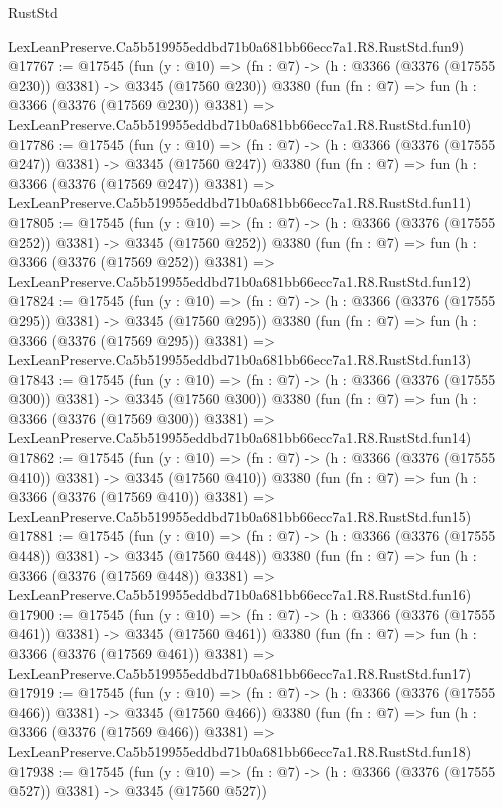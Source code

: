 \begin{lexlean}{RustStd}
\begin{coremodule}
    LexLeanPreserve.Ca5b519955eddbd71b0a681bb66ecc7a1.R8.RustStd.fun9)
@17767 := @17545
    (fun (y : @10) => (fn : @7) -> (h : @3366 (@3376 (@17555 @230)) @3381) -> @3345 (@17560 @230))
    @3380
    (fun (fn : @7) =>
    fun (h : @3366 (@3376 (@17569 @230)) @3381) =>
    LexLeanPreserve.Ca5b519955eddbd71b0a681bb66ecc7a1.R8.RustStd.fun10)
@17786 := @17545
    (fun (y : @10) => (fn : @7) -> (h : @3366 (@3376 (@17555 @247)) @3381) -> @3345 (@17560 @247))
    @3380
    (fun (fn : @7) =>
    fun (h : @3366 (@3376 (@17569 @247)) @3381) =>
    LexLeanPreserve.Ca5b519955eddbd71b0a681bb66ecc7a1.R8.RustStd.fun11)
@17805 := @17545
    (fun (y : @10) => (fn : @7) -> (h : @3366 (@3376 (@17555 @252)) @3381) -> @3345 (@17560 @252))
    @3380
    (fun (fn : @7) =>
    fun (h : @3366 (@3376 (@17569 @252)) @3381) =>
    LexLeanPreserve.Ca5b519955eddbd71b0a681bb66ecc7a1.R8.RustStd.fun12)
@17824 := @17545
    (fun (y : @10) => (fn : @7) -> (h : @3366 (@3376 (@17555 @295)) @3381) -> @3345 (@17560 @295))
    @3380
    (fun (fn : @7) =>
    fun (h : @3366 (@3376 (@17569 @295)) @3381) =>
    LexLeanPreserve.Ca5b519955eddbd71b0a681bb66ecc7a1.R8.RustStd.fun13)
@17843 := @17545
    (fun (y : @10) => (fn : @7) -> (h : @3366 (@3376 (@17555 @300)) @3381) -> @3345 (@17560 @300))
    @3380
    (fun (fn : @7) =>
    fun (h : @3366 (@3376 (@17569 @300)) @3381) =>
    LexLeanPreserve.Ca5b519955eddbd71b0a681bb66ecc7a1.R8.RustStd.fun14)
@17862 := @17545
    (fun (y : @10) => (fn : @7) -> (h : @3366 (@3376 (@17555 @410)) @3381) -> @3345 (@17560 @410))
    @3380
    (fun (fn : @7) =>
    fun (h : @3366 (@3376 (@17569 @410)) @3381) =>
    LexLeanPreserve.Ca5b519955eddbd71b0a681bb66ecc7a1.R8.RustStd.fun15)
@17881 := @17545
    (fun (y : @10) => (fn : @7) -> (h : @3366 (@3376 (@17555 @448)) @3381) -> @3345 (@17560 @448))
    @3380
    (fun (fn : @7) =>
    fun (h : @3366 (@3376 (@17569 @448)) @3381) =>
    LexLeanPreserve.Ca5b519955eddbd71b0a681bb66ecc7a1.R8.RustStd.fun16)
@17900 := @17545
    (fun (y : @10) => (fn : @7) -> (h : @3366 (@3376 (@17555 @461)) @3381) -> @3345 (@17560 @461))
    @3380
    (fun (fn : @7) =>
    fun (h : @3366 (@3376 (@17569 @461)) @3381) =>
    LexLeanPreserve.Ca5b519955eddbd71b0a681bb66ecc7a1.R8.RustStd.fun17)
@17919 := @17545
    (fun (y : @10) => (fn : @7) -> (h : @3366 (@3376 (@17555 @466)) @3381) -> @3345 (@17560 @466))
    @3380
    (fun (fn : @7) =>
    fun (h : @3366 (@3376 (@17569 @466)) @3381) =>
    LexLeanPreserve.Ca5b519955eddbd71b0a681bb66ecc7a1.R8.RustStd.fun18)
@17938 := @17545
    (fun (y : @10) => (fn : @7) -> (h : @3366 (@3376 (@17555 @527)) @3381) -> @3345 (@17560 @527))

\end{coremodule}
\end{lexlean}
